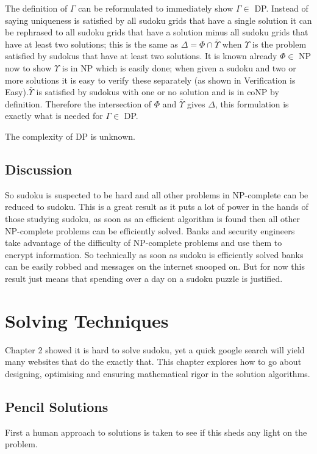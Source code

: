 \documentclass[a4paper,11pt]{report}
\begin{document}
{The definition of $\Gamma$ can be reformulated to immediately show $\Gamma\in$ DP. Instead of saying uniqueness is satisfied by all sudoku grids that have a single solution it can be rephrased to all sudoku grids that have a solution minus all sudoku grids that have at least two solutions; this is the same as $\Delta = \Phi \cap \bar{\Upsilon}$ when $\Upsilon$ is the problem satisfied by sudokus that have at least two solutions. It is known already $\Phi\in$ NP now to show $\Upsilon$ is in NP which is easily done; when given a sudoku and two or more solutions it is easy to verify these separately (as shown in Verification is Easy).$\bar{\Upsilon}$ is satisfied by sudokus with one or no solution and is in coNP by definition. Therefore the intersection of $\Phi$ and $\bar{\Upsilon}$ gives $\Delta$, this formulation is exactly what is needed for $\Gamma\in$ DP.

The complexity of DP is unknown\cite{dphardness}. 

\section{Discussion}
	
So sudoku is suspected to be hard and all other problems in NP-complete can be reduced to sudoku. This is a great result as it puts a lot of power in the hands of those studying sudoku, as soon as an efficient algorithm is found then all other NP-complete problems can be efficiently solved. Banks and security engineers take advantage of the difficulty of NP-complete problems and use them to encrypt information. So technically as soon as sudoku is efficiently solved banks can be easily robbed and messages on the internet snooped on. But for now this result just means that spending over a day on a sudoku puzzle is justified.

\chapter{Solving Techniques}
Chapter 2 showed it is hard to solve sudoku, yet a quick google search will yield many websites that do the exactly that. This chapter explores how to go about designing, optimising and ensuring mathematical rigor in the solution algorithms.
\section{Pencil Solutions}
First a human approach to solutions is taken to see if this sheds any light on the problem.

}
\end{document}
